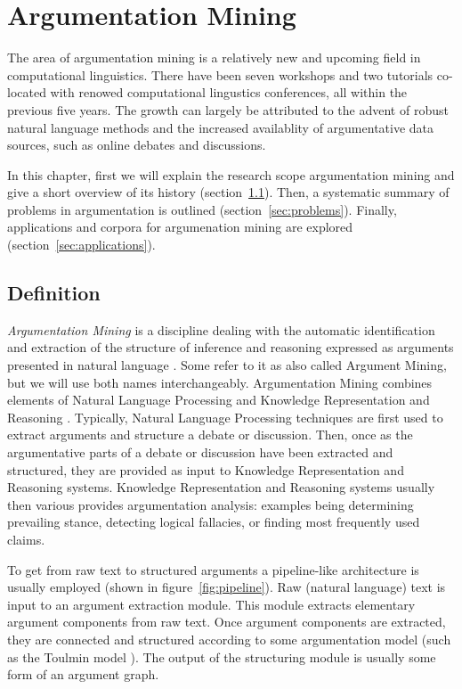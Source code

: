 \chapter{Argumentation Mining}

The area of argumentation mining is a
relatively new and upcoming field in computational
linguistics. 
There have been seven workshops and two tutorials co-located with renowed
computational lingustics conferences, all within the previous five years. The
growth can largely be attributed to the advent of robust natural language
methods and the increased availablity of argumentative data sources, such as
online debates and discussions. 

In this chapter, first we will explain the research scope argumentation
mining and give a short overview of its history (section~\ref{sec:definition}).
Then, a systematic summary of problems in argumentation is outlined
(section~\ref{sec:problems}). 
Finally, applications and corpora for argumenation mining 
are explored (section~\ref{sec:applications}). 

\section{Definition}
\label{sec:definition}

\emph{Argumentation Mining} is a discipline dealing with the automatic
identification and extraction of the structure of inference and reasoning
expressed as arguments presented in natural language
\citep{lawrence2019argument}.  Some refer to it as 
also called Argument Mining, but we will use both names interchangeably. 
Argumentation Mining combines elements of Natural Language Processing and 
Knowledge Representation and Reasoning \citep{cabrio2018five}. 
Typically, Natural Language Processing techniques are first used to extract
arguments and structure a debate or discussion. Then, once as the 
argumentative parts of a debate or discussion have been extracted and
structured, they are provided as input 
to Knowledge Representation and Reasoning systems. 
Knowledge Representation and
Reasoning systems usually then various provides argumentation analysis:
examples being determining prevailing stance, detecting logical
fallacies, or finding most frequently used claims.

To get from raw text to structured arguments a pipeline-like architecture
is usually employed (shown in figure~\ref{fig:pipeline}). 
Raw (natural language) text is input to an argument extraction module. This module
extracts elementary argument components from raw text. 
Once argument components are extracted, they are connected and structured 
according to some argumentation model (such as the Toulmin model \citep{toulmin2003uses}).
The output of the structuring module is usually some form of an argument graph. 

